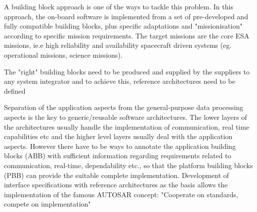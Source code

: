 A building block approach is one of the ways to tackle this problem. In this approach, the on-board software is implemented from a set of pre-developed and fully compatible building blocks, plus specific adaptations and "missionisation" according to specific mission requirements. The target missions are the core ESA missions, ie.e high reliability and availability spacecraft driven systems (eg. operational missions, science missions).

The "right" building blocks need to be produced and supplied by the suppliers to any system integrator and to achieve this, reference architectures need to be defined

Separation of the application aspects from the general-purpose data processing aspects is the key to generic/reusable software architectures. The lower layers of the architectures usually handle the implementation of communication, real time capabilities etc and the higher level layers usually deal with the application aspects. However there have to be ways to annotate the application building blocks (ABB) with sufficient information regarding requirements related to communication, real-time, dependability etc., so that the platform building blocks (PBB) can provide the suitable complete implementation. Development of interface specifications with reference architectures as the basis allows the implementation of the famous AUTOSAR concept: "Cooperate on standards, compete on implementation"


